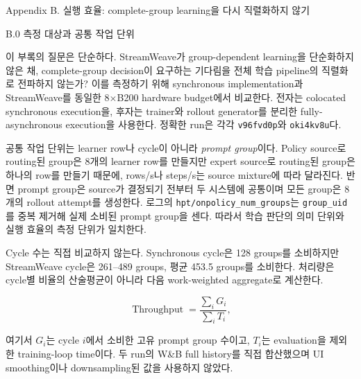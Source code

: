 
Appendix B. 실행 효율: complete-group learning을 다시 직렬화하지 않기

B.0 측정 대상과 공통 작업 단위

이 부록의 질문은 단순하다. StreamWeave가 group-dependent learning을 단순화하지 않은 채,
complete-group decision이 요구하는 기다림을 전체 학습 pipeline의 직렬화로 전파하지 않는가?
이를 측정하기 위해 synchronous implementation과 StreamWeave를 동일한 8$\times$B200
hardware budget에서 비교한다. 전자는 colocated synchronous execution을, 후자는 trainer와
rollout generator를 분리한 fully-asynchronous execution을 사용한다. 정확한 run은 각각
\texttt{v96fvd0p}와 \texttt{oki4kv8u}다.

공통 작업 단위는 learner row나 cycle이 아니라 \emph{prompt group}이다. Policy source로
routing된 group은 8개의 learner row를 만들지만 expert source로 routing된 group은 하나의
row를 만들기 때문에, rows/s나 steps/s는 source mixture에 따라 달라진다. 반면 prompt group은
source가 결정되기 전부터 두 시스템에 공통이며 모든 group은 8개의 rollout attempt를 생성한다.
로그의 \texttt{hpt/onpolicy\_num\_groups}는 \texttt{group\_uid}를 중복 제거해 실제 소비된
prompt group을 센다. 따라서 학습 판단의 의미 단위와 실행 효율의 측정 단위가 일치한다.

Cycle 수는 직접 비교하지 않는다. Synchronous cycle은 128 groups를 소비하지만 StreamWeave
cycle은 261--489 groups, 평균 453.5 groups를 소비한다. 처리량은 cycle별 비율의 산술평균이
아니라 다음 work-weighted aggregate로 계산한다.

\[
\operatorname{Throughput}
=
\frac{\sum_i G_i}{\sum_i T_i},
\]

여기서 \(G_i\)는 cycle \(i\)에서 소비한 고유 prompt group 수이고, \(T_i\)는 evaluation을
제외한 training-loop time이다. 두 run의 W\&B full history를 직접 합산했으며 UI smoothing이나
downsampling된 값을 사용하지 않았다.

